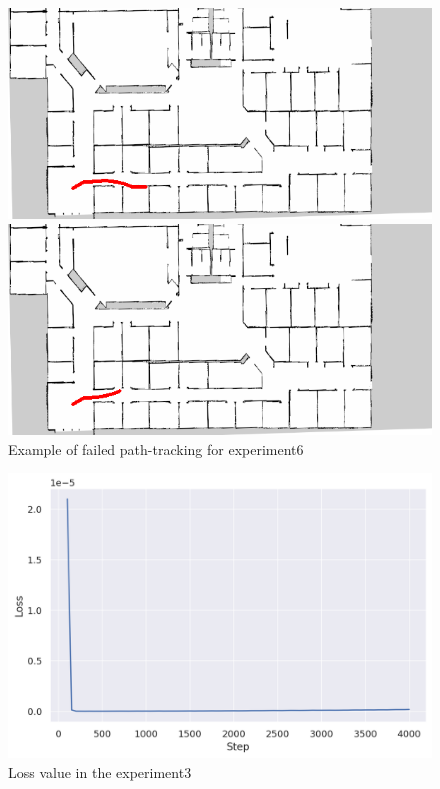 \begin{figure}[h]
  \begin{minipage}[b]{0.45\linewidth}
    \centering
    \includegraphics[keepaspectratio, scale=0.33]{images/9cam/traject19.png}
    \subcaption{}
  \end{minipage}
  \begin{minipage}[b]{0.45\linewidth}
    \centering
    \includegraphics[keepaspectratio, scale=0.33]{images/9cam/traject26.png}
    \subcaption{}
  \end{minipage}
\caption{Example of failed path-tracking for experiment6}
\label{Fig:fail6}
\end{figure}

\begin{figure}[h]
  \centering
  \includegraphics[keepaspectratio, scale=0.33]{images/exp3_25.png}
  \caption{Loss value in the experiment3}
  \label{Fig:loss3}
\end{figure}

